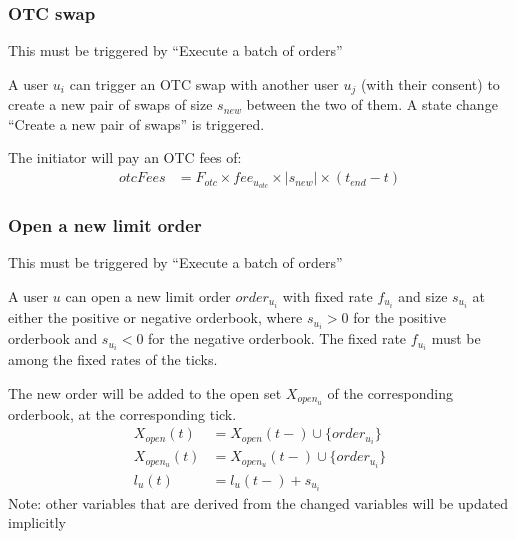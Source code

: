 \documentclass{article}%
\begin{document}
\subsubsection{OTC swap}
This must be triggered by ``Execute a batch of orders''

A user $u_i$ can trigger an OTC swap with another user $u_j$ (with their consent) to create a new pair of swaps of size $s_{new}$ between the two of them. A state change ``Create a new pair of swaps'' is triggered.

The initiator will pay an OTC fees of:
    \begin{align*}
        otcFees &= F_{otc} \times fee_{u_{otc}} \times | s_{new} | \times (t_{end} - t)
    \end{align*}

\subsubsection{Open a new limit order}

This must be triggered by ``Execute a batch of orders''

A user $u$ can open a new limit order $order_{u_i}$ with fixed rate $f_{u_i}$ and size $s_{u_i}$ at either the positive or negative orderbook, where $s_{u_i}>0$ for the positive orderbook and $s_{u_i}<0$ for the negative orderbook. The fixed rate $f_{u_i}$ must be among the fixed rates of the ticks.

The new order will be added to the open set $X_{open_u}$ of the corresponding orderbook, at the corresponding tick.
    \begin{align*}
        X_{open}(t) &= X_{open}(t-) \cup \{ order_{u_i} \}\\
        X_{open_{u}}(t) &= X_{open_{u}}(t-) \cup \{ order_{u_i} \}\\
        l_u(t) &= l_u(t-) + s_{u_i}
    \end{align*}
Note: other variables that are derived from the changed variables will be updated implicitly


\end{document}
